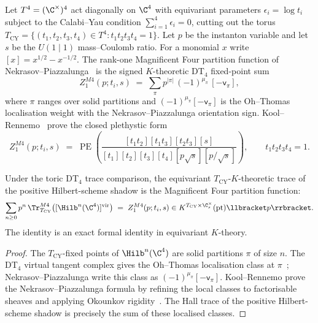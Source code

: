 \begin{definition}
\label{def:zm4-qgr}
Let $T^4 = (\C^\times)^4$ act diagonally on $\C^4$ with equivariant
parameters $\epsilon_i = \log t_i$ subject to the Calabi--Yau condition
$\sum_{i=1}^{4} \epsilon_i = 0$, cutting out the torus
$T_{\mathrm{CY}} = \{(t_1, t_2, t_3, t_4) \in T^4 : t_1 t_2 t_3 t_4 = 1\}$.
Let $p$ be the instanton variable and let $s$ be the $U(1\mid 1)$
mass--Coulomb ratio. For a monomial $x$ write
$[x]=x^{1/2}-x^{-1/2}$. The rank-one Magnificent Four partition function
of Nekrasov--Piazzalunga~\cite{NekrasovPiazzalunga2019} is the signed
$K$-theoretic DT$_4$ fixed-point sum
\[
 Z^{M4}_{1}(p;t_i,s)
 \;=\; \sum_{\pi} p^{|\pi|}\,(-1)^{\mu_\pi}\,[-\mathsf v_\pi],
\]
where $\pi$ ranges over solid partitions and
$(-1)^{\mu_\pi}[-\mathsf v_\pi]$ is the Oh--Thomas localisation weight
with the Nekrasov--Piazzalunga orientation sign. Kool--Rennemo~\cite{KoolRennemo2025}
prove the closed plethystic form
\[
 Z^{M4}_{1}(p;t_i,s)
 \;=\;
 \operatorname{PE}\!\left(
 \frac{[t_1t_2][t_1t_3][t_2t_3][s]}
 {[t_1][t_2][t_3][t_4][p\sqrt{s}][p/\sqrt{s}]}
 \right),
 \qquad t_1t_2t_3t_4=1.
\]
\end{definition}

\begin{theorem}
\label{thm:mag-four-partition-match-qgr}
Under the toric DT$_4$ trace comparison, the equivariant
$T_{\mathrm{CY}}$-$K$-theoretic trace of the positive Hilbert-scheme
shadow is the Magnificent Four partition function:
\[
 \sum_{n\geq0}p^n\,
 \Tr^{M4}_{T_{\mathrm{CY}}}\!\left([\Hilb^n(\C^4)]^{\mathrm{vir}}\right)
 \;=\; Z^{M4}_{1}(p;t_i,s)
 \in K^{T_{\mathrm{CY}}\times \C_s^\times}(\mathrm{pt})\llbracket p\rrbracket .
\]
The identity is an exact formal identity in equivariant $K$-theory.
\end{theorem}

\begin{proof}
The $T_{\mathrm{CY}}$-fixed points of $\Hilb^n(\C^4)$ are solid
partitions $\pi$ of size $n$. The DT$_4$ virtual tangent complex gives
the Oh--Thomas localisation class at $\pi$~\cite{OhThomas2023};
Nekrasov--Piazzalunga write this class as
$(-1)^{\mu_\pi}[-\mathsf v_\pi]$. Kool--Rennemo prove the
Nekrasov--Piazzalunga formula by refining the local classes to
factorisable sheaves and applying Okounkov rigidity~\cite{KoolRennemo2025}. The Hall trace of
the positive Hilbert-scheme shadow is precisely the sum of these
localised classes.
\end{proof}

